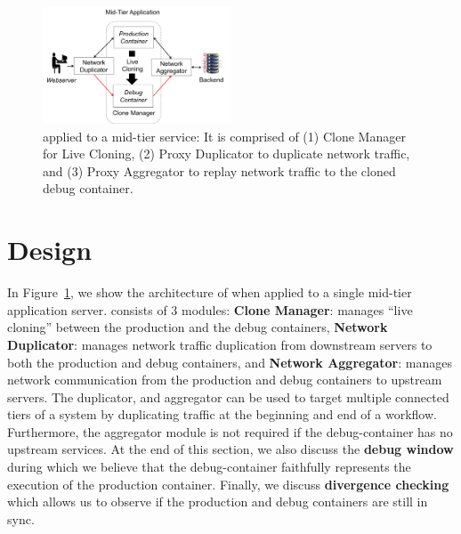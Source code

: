 
\begin{figure}[ht]
	\begin{center}
		\includegraphics[width=0.5\textwidth]{figs/arch.png}
		\caption{\parikshan applied to a mid-tier service: It is comprised of (1) Clone Manager for Live Cloning, (2) Proxy Duplicator to duplicate network traffic, and (3) Proxy Aggregator to replay network traffic to the cloned debug container.}
		\label{fig:workflow}
	\end{center}
\end{figure}

\vspace{-0.5cm}
\section{Design}
\label{sec:design}

In Figure~\ref{fig:workflow}, we show the architecture of \parikshan when applied to a single mid-tier application server.
\parikshan consists of 3 modules: 
\textbf{Clone Manager}: manages ``live cloning'' between the production and the debug containers, 
\textbf{Network Duplicator}: manages network traffic duplication from downstream servers to both the production and debug containers, 
and \textbf{Network Aggregator}: manages network communication from the production and debug containers to upstream servers.
The duplicator, and aggregator can be used to target multiple connected tiers of a system by duplicating traffic at the beginning and end of a workflow.
Furthermore, the aggregator module is not required if the debug-container has no upstream services. 
At the end of this section, we also discuss the \textbf{debug window} during which we believe that the debug-container faithfully represents the execution of the production container.
Finally, we discuss \textbf{divergence checking} which allows us to observe if the production and debug containers are still in sync.

